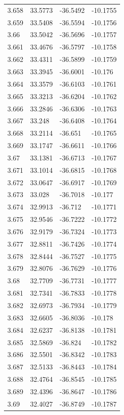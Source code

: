 \begin{tabular}{llll}
3.658 & 33.5773 & -36.5492 & -10.1755 \\
3.659 & 33.5408 & -36.5594 & -10.1756 \\
3.66 & 33.5042 & -36.5696 & -10.1757 \\
3.661 & 33.4676 & -36.5797 & -10.1758 \\
3.662 & 33.4311 & -36.5899 & -10.1759 \\
3.663 & 33.3945 & -36.6001 & -10.176 \\
3.664 & 33.3579 & -36.6103 & -10.1761 \\
3.665 & 33.3213 & -36.6204 & -10.1762 \\
3.666 & 33.2846 & -36.6306 & -10.1763 \\
3.667 & 33.248 & -36.6408 & -10.1764 \\
3.668 & 33.2114 & -36.651 & -10.1765 \\
3.669 & 33.1747 & -36.6611 & -10.1766 \\
3.67 & 33.1381 & -36.6713 & -10.1767 \\
3.671 & 33.1014 & -36.6815 & -10.1768 \\
3.672 & 33.0647 & -36.6917 & -10.1769 \\
3.673 & 33.028 & -36.7018 & -10.177 \\
3.674 & 32.9913 & -36.712 & -10.1771 \\
3.675 & 32.9546 & -36.7222 & -10.1772 \\
3.676 & 32.9179 & -36.7324 & -10.1773 \\
3.677 & 32.8811 & -36.7426 & -10.1774 \\
3.678 & 32.8444 & -36.7527 & -10.1775 \\
3.679 & 32.8076 & -36.7629 & -10.1776 \\
3.68 & 32.7709 & -36.7731 & -10.1777 \\
3.681 & 32.7341 & -36.7833 & -10.1778 \\
3.682 & 32.6973 & -36.7934 & -10.1779 \\
3.683 & 32.6605 & -36.8036 & -10.178 \\
3.684 & 32.6237 & -36.8138 & -10.1781 \\
3.685 & 32.5869 & -36.824 & -10.1782 \\
3.686 & 32.5501 & -36.8342 & -10.1783 \\
3.687 & 32.5133 & -36.8443 & -10.1784 \\
3.688 & 32.4764 & -36.8545 & -10.1785 \\
3.689 & 32.4396 & -36.8647 & -10.1786 \\
3.69 & 32.4027 & -36.8749 & -10.1787 \\

\end{tabular}
